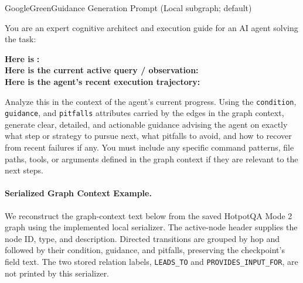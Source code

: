 \begin{tracebox}{GoogleGreen}{Guidance Generation Prompt (Local subgraph; default)}
\footnotesize\raggedright

\medskip
You are an expert cognitive architect and execution guide for an AI agent solving the task: 

\smallskip
\textbf{Here is} \textbf{:} \\
\textbf{Here is the current active query / observation:} \\
\textbf{Here is the agent's recent execution trajectory:} 

\medskip
Analyze this  in the context of the agent's current progress. Using the \texttt{condition}, \texttt{guidance}, and \texttt{pitfalls} attributes carried by the edges in the graph context, generate clear, detailed, and actionable guidance advising the agent on exactly what step or strategy to pursue next, what pitfalls to avoid, and how to recover from recent failures if any. You must include any specific command patterns, file paths, tools, or arguments defined in the graph context if they are relevant to the next steps.

\end{tracebox}

\paragraph{Serialized Graph Context Example.}
We reconstruct the graph-context text below from the saved HotpotQA Mode 2 graph using the implemented local serializer. The active-node header supplies the node ID, type, and description. Directed transitions are grouped by hop and followed by their condition, guidance, and pitfalls, preserving the checkpoint's field text. The two stored relation labels, \texttt{LEADS\_TO} and \texttt{PROVIDES\_INPUT\_FOR}, are not printed by this serializer.

